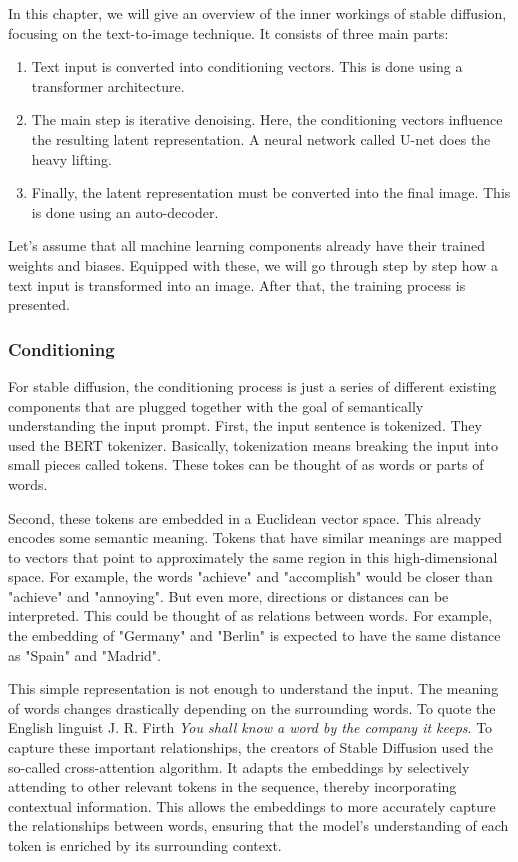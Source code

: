 \documentclass[11pt]{article}
\begin{document}
In this chapter, we will give an overview of the inner workings of stable diffusion, focusing on the text-to-image technique. It consists of three main parts:
\begin{enumerate}
    \item Text input is converted into conditioning vectors. This is done using a transformer architecture.
    \item The main step is iterative denoising. Here, the conditioning vectors influence the resulting latent representation. A neural network called U-net does the heavy lifting.
    \item Finally, the latent representation must be converted into the final image. This is done using an auto-decoder.
\end{enumerate}

Let's assume that all machine learning components already have their trained weights and biases. Equipped with these, we will go through step by step how a text input is transformed into an image. After that, the training process is presented.

\subsubsection{Conditioning}
For stable diffusion, the conditioning process is just a series of different existing components that are plugged together with the goal of semantically understanding the input prompt. First, the input sentence is tokenized. They used the BERT tokenizer\cite{devlin2019bert}. Basically, tokenization means breaking the input into small pieces called tokens. These tokes can be thought of as words or parts of words.

Second, these tokens are embedded in a Euclidean vector space. This already encodes some semantic meaning. Tokens that have similar meanings are mapped to vectors that point to approximately the same region in this high-dimensional space. For example, the words "achieve" and "accomplish" would be closer than "achieve" and "annoying". But even more, directions or distances can be interpreted. This could be thought of as relations between words. For example, the embedding of "Germany" and "Berlin" is expected to have the same distance as "Spain" and "Madrid".

This simple representation is not enough to understand the input. The meaning of words changes drastically depending on the surrounding words. To quote the English linguist J. R. Firth \textit{You shall know a word by the company it keeps}\cite{firth1962studiesinlinguisticanalysis}. To capture these important relationships, the creators of Stable Diffusion used the so-called cross-attention algorithm\cite{vaswani2023attentionneed}. It adapts the embeddings by selectively attending to other relevant tokens in the sequence, thereby incorporating contextual information. This allows the embeddings to more accurately capture the relationships between words, ensuring that the model's understanding of each token is enriched by its surrounding context.
\end{document}
